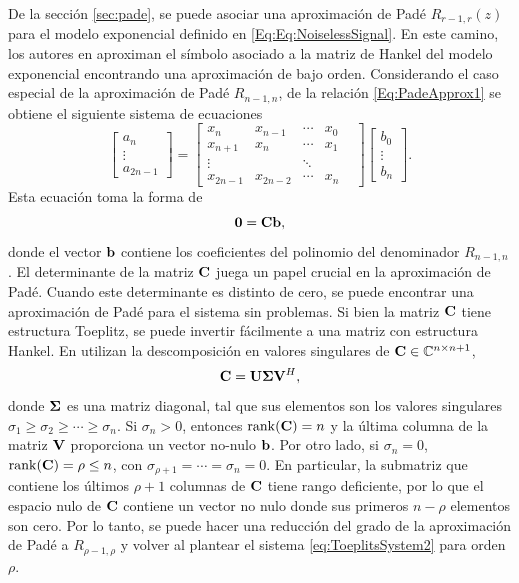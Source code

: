 	De la sección \ref{sec:pade}, se puede asociar una aproximación de Padé $R_{r-1,r}(z)$ para el modelo exponencial definido en \eqref{Eq:Eq:NoiselessSignal}. En este camino, los autores en \cite{Gonnet2013} aproximan el símbolo asociado a la matriz de Hankel del modelo exponencial encontrando una aproximación de bajo orden. Considerando el caso especial de la aproximación de Padé $R_{n-1,n}$, de la relación \eqref{Eq:PadeApprox1} se obtiene el siguiente sistema de ecuaciones
	\begin{equation}
		\begin{bmatrix} a_n \\[0.3em] \vdots \\[0.3em] a_{2n-1} 
		\end{bmatrix} = \begin{bmatrix} x_n & x_{n-1} & \cdots & x_0 \\[0.3em] x_{n+1} & x_{n} & \cdots & x_1 \\[0.3em]
		\vdots & & \ddots & & \\[0.3em]
		x_{2n-1} & x_{2n-2} & \cdots & x_n
	\end{bmatrix}\begin{bmatrix} b_0 \\[0.3em] \vdots\\[0.3em] b_n \end{bmatrix}.
	\label{eq:ToeplitsSystem}
	\end{equation}
	Esta ecuación toma la forma de
	\begin{equation}
		\mathbf{0} = \mathbf{C}\mathbf{b},
		\label{eq:ToeplitsSystem2}
	\end{equation}
	donde el vector $\mathbf{b}$ contiene los coeficientes del polinomio del denominador $R_{n-1,n}$. El determinante de la matriz $\mathbf{C}$ juega un papel crucial en la aproximación de Padé. Cuando este determinante es distinto de cero, se puede encontrar una aproximación de Padé para el sistema sin problemas. Si bien la matriz $\mathbf{C}$ tiene estructura Toeplitz, se puede invertir fácilmente a una matriz con estructura Hankel. En \cite{Gonnet2013} utilizan la descomposición en valores singulares de $\mathbf{C}\in\mathbb{C}^{n\times n+1}$,
	\begin{equation}
		\mathbf{C} = \mathbf{U}\boldsymbol{\Sigma}\mathbf{V}^H,
	\end{equation} 
	donde $\boldsymbol{\Sigma}$ es una matriz diagonal, tal que sus elementos son los valores singulares $\sigma_1\ge\sigma_2\ge\cdots\ge\sigma_n$. Si $\sigma_n>0$, entonces $\mathrm{rank}(\mathbf{C}) = n$ y la última columna de la matriz $\mathbf{V}$ proporciona un vector no-nulo $\mathbf{b}$. Por otro lado, si $\sigma_{n} = 0$, $\mathrm{rank}(\mathbf{C}) = \rho\le n$, con $\sigma_{\rho+1}=\cdots=\sigma_{n}=0$. En particular, la submatriz que contiene los últimos $\rho+1$ columnas de $\mathbf{C}$ tiene rango deficiente, por lo que el espacio nulo de $\mathbf{C}$ contiene un vector no nulo donde sus primeros $n-\rho$ elementos son cero. Por lo tanto, se puede hacer una reducción del grado de la aproximación de Padé a $R_{\rho-1,\rho}$ y volver al plantear el sistema \eqref{eq:ToeplitsSystem2} para orden $\rho$.
	
